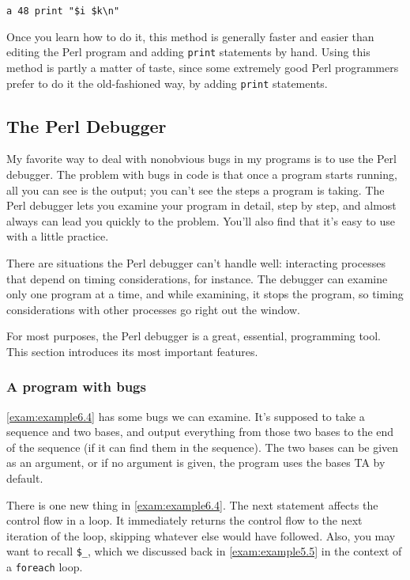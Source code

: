 \begin{lstlisting}
a 48 print "$i $k\n"
\end{lstlisting}

Once you learn how to do it, this method is generally faster and easier than editing the Perl program and adding \verb|print| statements by hand. Using this method is partly a matter of taste, since some extremely good Perl programmers prefer to do it the old-fashioned way, by adding \verb|print| statements. 

\subsection{The Perl Debugger}
My favorite way to deal with nonobvious bugs in my programs is to use the Perl debugger. The problem with bugs in code is that once a program starts running, all you can see is the output; you can't see the steps a program is taking. The Perl debugger lets you examine your program in detail, step by step, and almost always can lead you quickly to the problem. You'll also find that it's easy to use with a little practice.

There are situations the Perl debugger can't handle well: interacting processes that depend on timing considerations, for instance. The debugger can examine only one program at a time, and while examining, it stops the program, so timing considerations with other processes go right out the window.

For most purposes, the Perl debugger is a great, essential, programming tool. This section introduces its most important features. 

\subsubsection{A program with bugs}
\autoref{exam:example6.4} has some bugs we can examine. It's supposed to take a sequence and two bases, and output everything from those two bases to the end of the sequence (if it can find them in the sequence). The two bases can be given as an argument, or if no argument is given, the program uses the bases TA by default.

There is one new thing in \autoref{exam:example6.4}. The next statement affects the control flow in a loop. It immediately returns the control flow to the next iteration of the loop, skipping whatever else would have followed.  Also, you may want to recall \verb|$_|, which we discussed back in \autoref{exam:example5.5}
in the context of a \verb|foreach| loop. 

